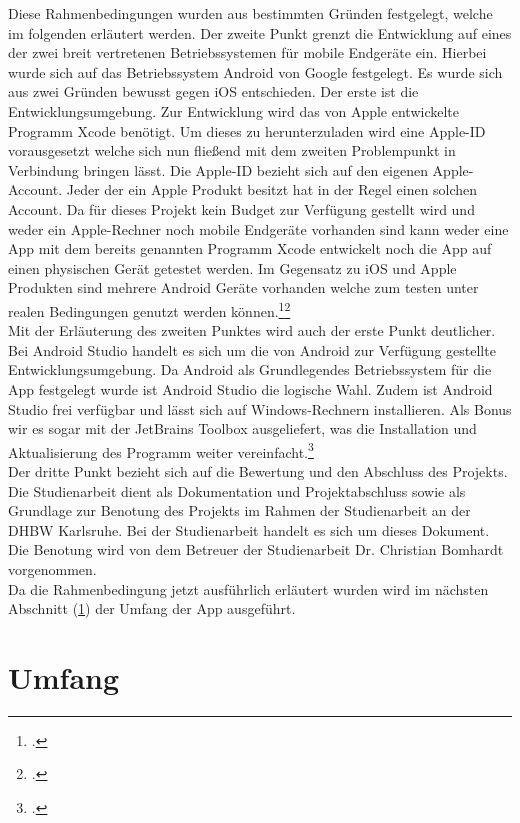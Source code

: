 Diese Rahmenbedingungen wurden aus bestimmten Gründen festgelegt, welche im folgenden erläutert werden.
Der zweite Punkt grenzt die Entwicklung auf eines der zwei breit vertretenen Betriebssystemen für mobile Endgeräte ein. Hierbei wurde sich auf das Betriebssystem Android von Google festgelegt. Es wurde sich aus zwei Gründen bewusst gegen iOS entschieden. Der erste ist die Entwicklungsumgebung. Zur Entwicklung wird das von Apple entwickelte Programm Xcode benötigt. Um dieses zu herunterzuladen wird eine Apple-ID vorausgesetzt welche sich nun fließend mit dem zweiten Problempunkt in Verbindung bringen lässt. Die Apple-ID bezieht sich auf den eigenen Apple-Account. Jeder der ein Apple Produkt besitzt hat in der Regel einen solchen Account. Da für dieses Projekt kein Budget zur Verfügung gestellt wird und weder ein Apple-Rechner noch mobile Endgeräte vorhanden sind kann weder eine App mit dem bereits genannten Programm Xcode entwickelt noch die App auf einen physischen Gerät getestet werden. Im Gegensatz zu iOS und Apple Produkten sind mehrere Android Geräte vorhanden welche zum testen unter realen Bedingungen genutzt werden können.\footcite{chipIPhone.2019}\footcite{Xcode.2021} \\
Mit der Erläuterung des zweiten Punktes wird auch der erste Punkt deutlicher. Bei Android Studio handelt es sich um die von Android zur Verfügung gestellte Entwicklungsumgebung. Da Android als Grundlegendes Betriebssystem für die App festgelegt wurde ist Android Studio die logische Wahl. Zudem ist Android Studio frei verfügbar und lässt sich auf Windows-Rechnern installieren. Als Bonus wir es sogar mit der JetBrains Toolbox ausgeliefert, was die Installation und Aktualisierung des Programm weiter vereinfacht.\footcite{AndroidStudio.2021} \\
Der dritte Punkt bezieht sich auf die Bewertung und den Abschluss des Projekts. Die Studienarbeit dient als Dokumentation und Projektabschluss sowie als Grundlage zur Benotung des Projekts im Rahmen der Studienarbeit an der \ac{DHBW} Karlsruhe. Bei der Studienarbeit handelt es sich um dieses Dokument. Die Benotung wird von dem Betreuer der Studienarbeit Dr. Christian Bomhardt vorgenommen.\\
Da die Rahmenbedingung jetzt ausführlich erläutert wurden wird im nächsten Abschnitt (\ref{sec:umfang}) der Umfang der App ausgeführt.

\section{Umfang}\label{sec:umfang}

